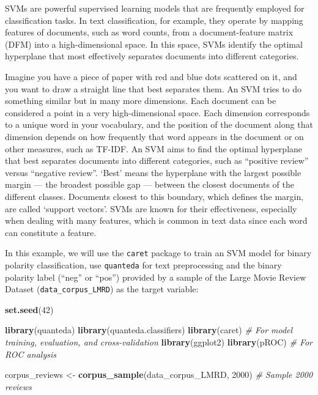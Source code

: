 \documentclass[
]{book}
\newenvironment{Shaded}{\begin{snugshade}}{\end{snugshade}}
\newcommand{\CommentTok}[1]{\textcolor[rgb]{0.56,0.35,0.01}{\textit{#1}}}
\newcommand{\DecValTok}[1]{\textcolor[rgb]{0.00,0.00,0.81}{#1}}
\newcommand{\FunctionTok}[1]{\textcolor[rgb]{0.13,0.29,0.53}{\textbf{#1}}}
\newcommand{\NormalTok}[1]{#1}
\newcommand{\OtherTok}[1]{\textcolor[rgb]{0.56,0.35,0.01}{#1}}
\begin{document}
SVMs are powerful supervised learning models that are frequently employed for classification tasks. In text classification, for example, they operate by mapping features of documents, such as word counts, from a document-feature matrix (DFM) into a high-dimensional space. In this space, SVMs identify the optimal hyperplane that most effectively separates documents into different categories.

Imagine you have a piece of paper with red and blue dots scattered on it, and you want to draw a straight line that best separates them. An SVM tries to do something similar but in many more dimensions. Each document can be considered a point in a very high-dimensional space. Each dimension corresponds to a unique word in your vocabulary, and the position of the document along that dimension depends on how frequently that word appears in the document or on other measures, such as TF-IDF. An SVM aims to find the optimal hyperplane that best separates documents into different categories, such as ``positive review'' versus ``negative review''. `Best' means the hyperplane with the largest possible margin --- the broadest possible gap --- between the closest documents of the different classes. Documents closest to this boundary, which defines the margin, are called `support vectors'. SVMs are known for their effectiveness, especially when dealing with many features, which is common in text data since each word can constitute a feature.

In this example, we will use the \texttt{caret} package to train an SVM model for binary polarity classification, use \texttt{quanteda} for text preprocessing and the binary polarity label (``neg'' or ``pos'') provided by a sample of the Large Movie Review Dataset (\texttt{data\_corpus\_LMRD}) as the target variable:

\begin{Shaded}
\begin{Highlighting}[]
\FunctionTok{set.seed}\NormalTok{(}\DecValTok{42}\NormalTok{)}

\FunctionTok{library}\NormalTok{(quanteda)}
\FunctionTok{library}\NormalTok{(quanteda.classifiers)}
\FunctionTok{library}\NormalTok{(caret)  }\CommentTok{\# For model training, evaluation, and cross{-}validation}
\FunctionTok{library}\NormalTok{(ggplot2)}
\FunctionTok{library}\NormalTok{(pROC)  }\CommentTok{\# For ROC analysis}

\NormalTok{corpus\_reviews }\OtherTok{\textless{}{-}} \FunctionTok{corpus\_sample}\NormalTok{(data\_corpus\_LMRD, }\DecValTok{2000}\NormalTok{)  }\CommentTok{\# Sample 2000 reviews}
\end{Highlighting}
\end{Shaded}
\end{document}
